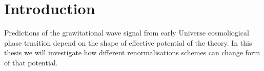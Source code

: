 \chapter{Introduction}
Predictions of the grawitational wave signal from early Universe cosmoliogical phase trnsition 
depend on the shape of effective potential of the theory. 
In this thesis we will investigate how different renormalisations schemes can change 
form of that potential.




